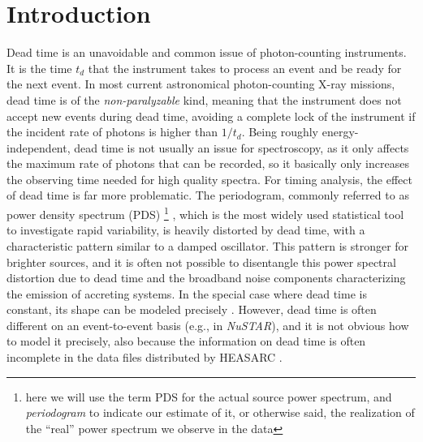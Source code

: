 \documentclass[twocolumn]{aastex61}
\newcommand{\project}[1]{\textsl{#1}}
\newcommand{\nustar}{\project{NuSTAR}\xspace}
\newcommand{\deadt}{\ensuremath{t_d}\xspace}
\begin{document}
\section{Introduction} \label{sec:intro}
Dead time is an unavoidable and common issue of photon-counting instruments.
It is the time $\deadt$ that the instrument takes to process an event and be ready for the next event.
In most current astronomical photon-counting X-ray missions, dead time is of the \textit{non-paralyzable} kind, meaning that the instrument does not accept new events during dead time, avoiding a complete lock of the instrument if the incident rate of photons is higher than $1/\deadt$.
Being roughly energy-independent, dead time is not usually an issue for spectroscopy, as it only affects the maximum rate of photons that can be recorded, so it basically only increases the observing time needed for high quality spectra.
For timing analysis, the effect of dead time is far more problematic.
The periodogram, commonly referred to as power density spectrum (PDS)%
\footnote{here we will use the term PDS for the actual source power spectrum, and \textit{periodogram} to indicate our estimate of it, or otherwise said, the realization of the ``real'' power spectrum we observe in the data}%
, which is the most widely used statistical tool to investigate rapid variability, is heavily distorted by dead time, with a characteristic pattern similar to a damped oscillator.
This pattern is stronger for brighter sources, and it is often not possible to disentangle this power spectral distortion due to dead time and the broadband noise components characterizing the emission of accreting systems.
In the special case where dead time is constant, its shape can be modeled precisely \citep{Zhang+95,Vikhlinin+94}.
However, dead time is often different on an event-to-event basis (e.g., in \nustar), and it is not obvious how to model it precisely, also because the information on dead time is often incomplete in the data files distributed by HEASARC \citep[see, e.g.][]{Bachetti+15}.

\end{document}
